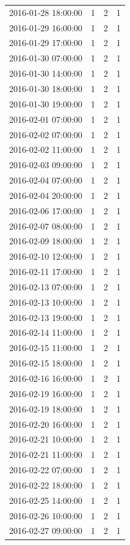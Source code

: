 \begin{tabular}{lrrr}
2016-01-28 18:00:00 & 1 & 2 & 1 \\
2016-01-29 16:00:00 & 1 & 2 & 1 \\
2016-01-29 17:00:00 & 1 & 2 & 1 \\
2016-01-30 07:00:00 & 1 & 2 & 1 \\
2016-01-30 14:00:00 & 1 & 2 & 1 \\
2016-01-30 18:00:00 & 1 & 2 & 1 \\
2016-01-30 19:00:00 & 1 & 2 & 1 \\
2016-02-01 07:00:00 & 1 & 2 & 1 \\
2016-02-02 07:00:00 & 1 & 2 & 1 \\
2016-02-02 11:00:00 & 1 & 2 & 1 \\
2016-02-03 09:00:00 & 1 & 2 & 1 \\
2016-02-04 07:00:00 & 1 & 2 & 1 \\
2016-02-04 20:00:00 & 1 & 2 & 1 \\
2016-02-06 17:00:00 & 1 & 2 & 1 \\
2016-02-07 08:00:00 & 1 & 2 & 1 \\
2016-02-09 18:00:00 & 1 & 2 & 1 \\
2016-02-10 12:00:00 & 1 & 2 & 1 \\
2016-02-11 17:00:00 & 1 & 2 & 1 \\
2016-02-13 07:00:00 & 1 & 2 & 1 \\
2016-02-13 10:00:00 & 1 & 2 & 1 \\
2016-02-13 19:00:00 & 1 & 2 & 1 \\
2016-02-14 11:00:00 & 1 & 2 & 1 \\
2016-02-15 11:00:00 & 1 & 2 & 1 \\
2016-02-15 18:00:00 & 1 & 2 & 1 \\
2016-02-16 16:00:00 & 1 & 2 & 1 \\
2016-02-19 16:00:00 & 1 & 2 & 1 \\
2016-02-19 18:00:00 & 1 & 2 & 1 \\
2016-02-20 16:00:00 & 1 & 2 & 1 \\
2016-02-21 10:00:00 & 1 & 2 & 1 \\
2016-02-21 11:00:00 & 1 & 2 & 1 \\
2016-02-22 07:00:00 & 1 & 2 & 1 \\
2016-02-22 18:00:00 & 1 & 2 & 1 \\
2016-02-25 14:00:00 & 1 & 2 & 1 \\
2016-02-26 10:00:00 & 1 & 2 & 1 \\
2016-02-27 09:00:00 & 1 & 2 & 1 \\

\end{tabular}
